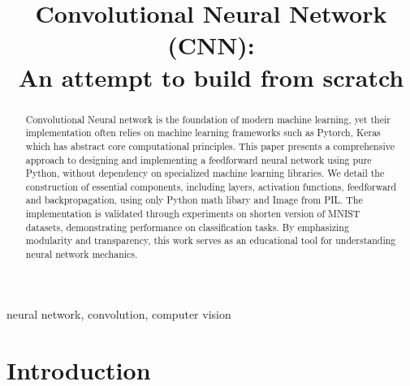 \documentclass[journal]{IEEEtran} %
\begin{document}
\title{Convolutional Neural Network (CNN): \\ An attempt to build from scratch\\

}

\author{
}

\maketitle

\begin{abstract}
     Convolutional Neural network is the foundation of modern machine learning, yet their implementation often relies on machine learning frameworks such as Pytorch, Keras which has abstract core computational principles. This paper presents a comprehensive approach to designing and implementing a feedforward neural network using pure Python, without dependency on specialized machine learning libraries. We detail the construction of essential components, including layers, activation functions, feedforward and backpropagation, using only Python math libary and Image from PIL. The implementation is validated through experiments on shorten version of MNIST datasets, demonstrating performance on classification tasks. By emphasizing modularity and transparency, this work serves as an educational tool for understanding neural network mechanics.
\end{abstract}

\begin{IEEEkeywords}
    neural network, convolution, computer vision
\end{IEEEkeywords}

\section{Introduction}
\end{document}
